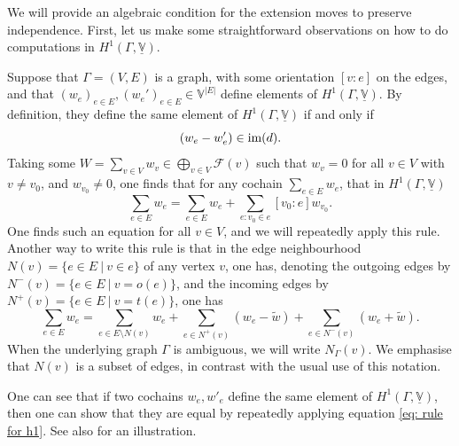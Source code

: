 \documentclass{article}
\theoremstyle{definition}
\theoremstyle{remark}
\newcommand{\im}{\textup{im}}
\begin{document}
We will provide an algebraic condition for the extension moves to preserve independence. First, let us make some straightforward observations on how to do computations in $H^{1}(\Gamma, \underline{\mathbb{V}})$. 

Suppose that $\Gamma=(V,E)$ is a graph, with some orientation $[v: e]$ on the edges, and that $(w_{e})_{e\in E}, (w_{e}')_{e\in E} \in \mathbb{V}^{|E|}$ define elements of $H^{1}(\Gamma, \underline{\mathbb{V}})$. By definition, they define the same element of $ H^{1}(\Gamma, \underline{\mathbb{V}})$ if and only if
\begin{equation*}
    (w_{e} - w_{e}')\in \im(d).
\end{equation*}
Taking some $W = \sum_{v\in V} w_v \in \bigoplus_{v\in V}\mathcal{F}(v)$ such that $w_{v}= 0$ for all $v\in V$ with $v\neq v_0$, and $w_{v_0} \neq 0$, one finds that for any cochain $\sum_{e\in E} w_{e}$, that in $H^{1}(\Gamma, \underline{\mathbb{V}})$
\begin{equation} \label{eq: rule for h1}
    \sum_{e\in E} w_e = \sum_{e\in E} w_e + \sum_{e: v_0\in e} [v_0: e] w_{v_0}.
\end{equation}
One finds such an equation for all $v\in V$, and we will repeatedly apply this rule. Another way to write this rule is that in the edge neighbourhood $N(v) =\{e\in E~ \vert ~ v\in  e\}$ of any vertex $v$, one has, denoting the outgoing edges by $N^{-}(v) =\{e\in E~ \vert ~ v = o(e)\}$, and the incoming edges by $N^{+}(v) =\{e\in E~ \vert ~ v = t(e)\}$, one has
\begin{equation*}
    \sum_{e\in E} w_e  = \sum_{e\in E\setminus N(v)} w_e + \sum_{e\in N^{+}(v)} (w_e - \tilde{w}) + \sum_{e\in N^{-}(v)} (w_e + \tilde{w}).
\end{equation*}
When the underlying graph $\Gamma$ is ambiguous, we will write $N_{\Gamma}(v)$. We emphasise that $N(v)$ is a subset of edges, in contrast with the usual use of this notation.  

One can see that if two cochains $w_{e}, w'_{e}$ define the same element of $H^{1}(\Gamma, \underline{\mathbb{V}})$, then one can show that they are equal by repeatedly applying equation \eqref{eq: rule for h1}. See also  for an illustration. 
\end{document}
